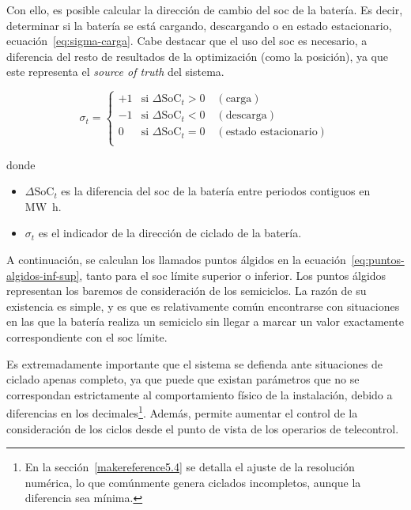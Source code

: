 Con ello, es posible calcular la dirección de cambio del \gls{soc} de la batería. Es decir, determinar si la batería se está cargando, descargando o en estado estacionario, ecuación~\ref{eq:sigma-carga}. Cabe destacar que el uso del \gls{soc} es necesario, a diferencia del resto de resultados de la optimización (como la posición), ya que este representa el \textit{source of truth} del sistema.

\begin{samepage}

  \begin{equation}%
    \label{eq:sigma-carga}
    \sigma_{t} =
    \begin{cases}
      +1 & \text{si } \Delta\mathrm{SoC}_{t} > 0 \quad (\text{carga})               \\
      -1 & \text{si } \Delta\mathrm{SoC}_{t} < 0 \quad (\text{descarga})            \\
      0  & \text{si } \Delta\mathrm{SoC}_{t} = 0 \quad (\text{estado estacionario}) \\
    \end{cases}
  \end{equation}

  donde

  \begin{itemize}

    \item \( \Delta \mathrm{SoC}_{t} \) es la diferencia del \gls{soc} de la batería entre periodos contiguos en \si{{\mega\watt\hour}}.

    \item \( \sigma_{t} \) es el indicador de la dirección de ciclado de la batería.

  \end{itemize}

\end{samepage}

A continuación, se calculan los llamados puntos álgidos en la ecuación~\ref{eq:puntos-algidos-inf-sup}, tanto para el \gls{soc} límite superior o inferior. Los puntos álgidos representan los baremos de consideración de los semiciclos. La razón de su existencia es simple, y es que es relativamente común encontrarse con situaciones en las que la batería realiza un semiciclo sin llegar a marcar un valor exactamente correspondiente con el \gls{soc} límite.

Es extremadamente importante que el sistema se defienda ante situaciones de ciclado apenas completo, ya que puede que existan parámetros que no se correspondan estrictamente al comportamiento físico de la instalación, debido a diferencias en los decimales\footnote{En la sección~\ref{makereference5.4} se detalla el ajuste de la resolución numérica, lo que comúnmente genera ciclados incompletos, aunque la diferencia sea mínima.}. Además, permite aumentar el control de la consideración de los ciclos desde el punto de vista de los operarios de telecontrol.

